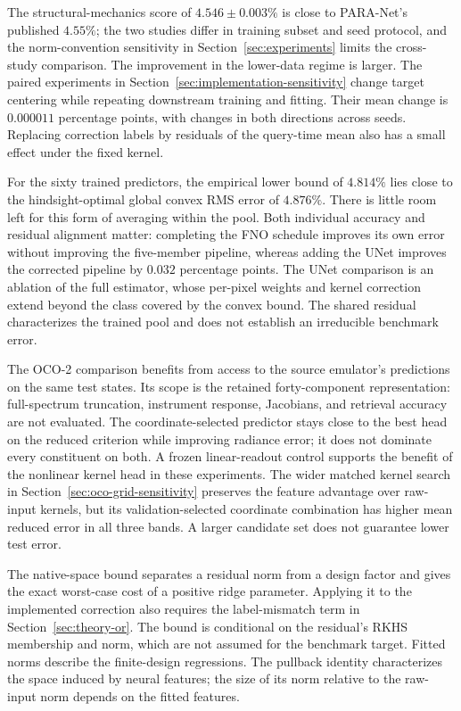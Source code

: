\documentclass[twoside,11pt]{article}
\newcommand{\errSix}{4.546}          %
\newcommand{\errSixSd}{0.003}
\newcommand{\unetGain}{0.032}        %
\newcommand{\saSixtyOracleRms}{4.876}
\newcommand{\saBound}{4.814}         %
\newcommand{\pubBestHi}{4.55}        %
\newcommand{\sensCenterDelta}{0.000011}
\begin{document}
The structural-mechanics score of $\errSix\pm\errSixSd\%$ is close to PARA-Net's published $\pubBestHi\%$; the two studies differ in training subset and seed protocol, and the norm-convention sensitivity in Section~\ref{sec:experiments} limits the cross-study comparison. The improvement in the lower-data regime is larger. The paired experiments in Section~\ref{sec:implementation-sensitivity} change target centering while repeating downstream training and fitting. Their mean change is $\sensCenterDelta$ percentage points, with changes in both directions across seeds. Replacing correction labels by residuals of the query-time mean also has a small effect under the fixed kernel.

For the sixty trained predictors, the empirical lower bound of $\saBound\%$ lies close to the hindsight-optimal global convex RMS error of $\saSixtyOracleRms\%$. There is little room left for this form of averaging within the pool. Both individual accuracy and residual alignment matter: completing the FNO schedule improves its own error without improving the five-member pipeline, whereas adding the UNet improves the corrected pipeline by $\unetGain$ percentage points. The UNet comparison is an ablation of the full estimator, whose per-pixel weights and kernel correction extend beyond the class covered by the convex bound. The shared residual characterizes the trained pool and does not establish an irreducible benchmark error.

The OCO-2 comparison benefits from access to the source emulator's predictions on the same test states. Its scope is the retained forty-component representation: full-spectrum truncation, instrument response, Jacobians, and retrieval accuracy are not evaluated. The coordinate-selected predictor stays close to the best head on the reduced criterion while improving radiance error; it does not dominate every constituent on both. A frozen linear-readout control supports the benefit of the nonlinear kernel head in these experiments. The wider matched kernel search in Section~\ref{sec:oco-grid-sensitivity} preserves the feature advantage over raw-input kernels, but its validation-selected coordinate combination has higher mean reduced error in all three bands. A larger candidate set does not guarantee lower test error.

The native-space bound separates a residual norm from a design factor and gives the exact worst-case cost of a positive ridge parameter. Applying it to the implemented correction also requires the label-mismatch term in Section~\ref{sec:theory-or}. The bound is conditional on the residual's RKHS membership and norm, which are not assumed for the benchmark target. Fitted norms describe the finite-design regressions. The pullback identity characterizes the space induced by neural features; the size of its norm relative to the raw-input norm depends on the fitted features.
\end{document}
